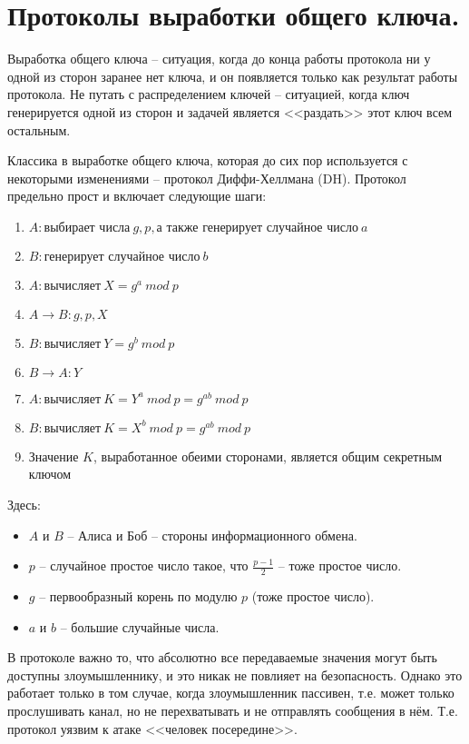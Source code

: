 \section{Протоколы выработки общего ключа.}

Выработка общего ключа -- ситуация, когда до конца работы протокола ни у одной из сторон заранее нет ключа, и он появляется только как результат работы протокола. Не путать с распределением ключей -- ситуацией, когда ключ генерируется одной из сторон и задачей является <<раздать>> этот ключ всем остальным. 

Классика в выработке общего ключа, которая до сих пор используется с некоторыми изменениями -- протокол Диффи-Хеллмана (DH). Протокол предельно прост и включает следующие шаги:

\begin{enumerate}
	\item $A: \text{выбирает числа}\ g, p, \text{а также генерирует случайное число}\ a$
	\item $B: \text{генерирует случайное число}\ b$
	\item $A: \text{вычисляет}\ X = g^a\ mod\ p$
	\item $A \rightarrow B: g, p, X$
	\item $B: \text{вычисляет}\ Y = g^b\ mod\ p$
	\item $B \rightarrow A: Y$
	\item $A: \text{вычисляет}\ K = Y^a\ mod\ p = g^{ab}\ mod\ p$
	\item $B: \text{вычисляет}\ K = X^b\ mod\ p = g^{ab}\ mod\ p$
	\item Значение $K$, выработанное обеими сторонами, является общим секретным ключом
\end{enumerate}

Здесь:

\begin{itemize}
	\item $A$ и $B$ -- Алиса и Боб -- стороны информационного обмена.
	\item $p$ -- случайное простое число такое, что $\frac{p - 1}{2}$ -- тоже простое число.
	\item $g$ -- первообразный корень по модулю $p$ (тоже простое число).
	\item $a$ и $b$ -- большие случайные числа. 
\end{itemize}

В протоколе важно то, что абсолютно все передаваемые значения могут быть доступны злоумышленнику, и это никак не повлияет на безопасность. Однако это работает только в том случае, когда злоумышленник пассивен, т.е. может только прослушивать канал, но не перехватывать и не отправлять сообщения в нём. Т.е. протокол уязвим к атаке <<человек посередине>>. 

